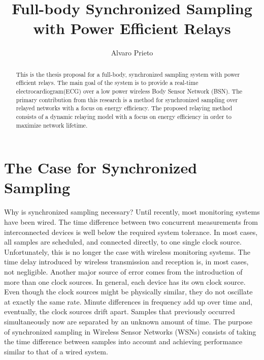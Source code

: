 \documentclass{article}
\begin{document}
\title{Full-body Synchronized Sampling with Power Efficient Relays}
\author{Alvaro Prieto}
\maketitle

\begin{abstract}
This is the thesis proposal for a full-body, synchronized sampling system with power efficient relays. The main goal of the system is to provide a real-time electrocardiogram(ECG) over a low power wireless Body Sensor Network (BSN). 
The primary contribution from this research is a method for synchronized sampling over relayed networks with a focus on energy efficiency. The proposed relaying method consists of a dynamic relaying model with a focus on energy efficiency in order to maximize network lifetime.
\end{abstract}

\pagebreak

\tableofcontents

\pagebreak

\section{The Case for Synchronized Sampling}
Why is synchronized sampling necessary? Until recently, most monitoring systems have been wired. The time difference between two concurrent measurements from interconnected devices is well below the required system tolerance. In most cases, all samples are scheduled, and connected directly, to one single clock source. Unfortunately, this is no longer the case with wireless monitoring systems. The time delay introduced by wireless transmission and reception is, in most cases, not negligible. Another major source of error comes from the introduction of more than one clock sources. In general, each device has its own clock source. Even though the clock sources might be physically similar, they do not oscillate at exactly the same rate. Minute differences in frequency add up over time and, eventually, the clock sources drift apart. Samples that previously occurred simultaneously now are separated by an unknown amount of time. The purpose of synchronized sampling in Wireless Sensor Networks (WSNs) consists of taking the time difference between samples into account and achieving performance similar to that of a wired system.


\end{document}
